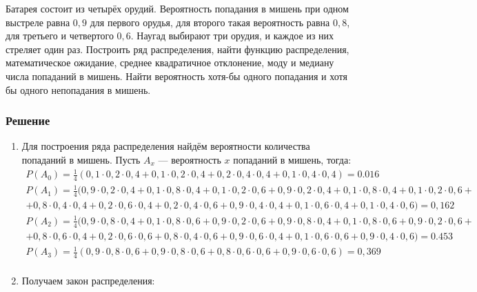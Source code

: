 \documentclass[14pt]{article}
\begin{document}
    Батарея состоит из четырёх орудий.
    Вероятность попадания в мишень при одном выстреле равна $0,9$ для первого орудья, для второго такая вероятность равна $0,8$, для третьего и четвертого $0,6$.
    Наугад выбирают три орудия, и каждое из них стреляет один раз.
    Построить ряд распределения, найти функцию распределения, математическое ожидание, среднее квадратичное отклонение, моду и медиану числа попаданий в мишень.
    Найти вероятность хотя-бы одного попадания и хотя бы одного непопадания в мишень.
    \subsubsection*{Решение}

    \begin{enumerate}[wide, labelwidth=!, labelindent=0pt]
        \item Для построения ряда распределения найдём вероятности количества попаданий в мишень.
        Пусть $A_x$ --- вероятность $x$ попаданий в мишень, тогда:
        \begin{gather*}
            P(A_0) = \frac{1}{4} ( 0,1 \cdot 0,2 \cdot 0,4 + 0,1 \cdot 0,2 \cdot 0,4 + 0,2 \cdot 0,4 \cdot 0,4 + 0,1 \cdot 0,4 \cdot 0,4 ) = 0.016  \\
            P(A_1) = \frac{1}{4} ( 0,9 \cdot 0,2 \cdot 0,4 + 0,1 \cdot 0,8 \cdot 0,4 + 0,1 \cdot 0,2 \cdot 0,6
            + 0,9 \cdot 0,2 \cdot 0,4 + 0,1 \cdot 0,8 \cdot 0,4 + 0,1 \cdot 0,2 \cdot 0,6 + \\
            + 0,8 \cdot 0,4 \cdot 0,4 + 0,2 \cdot 0,6 \cdot 0,4 + 0,2 \cdot 0,4 \cdot 0,6
            + 0,9 \cdot 0,4 \cdot 0,4 + 0,1 \cdot 0,6 \cdot 0,4 + 0,1 \cdot 0,4 \cdot 0,6 ) = 0,162 \\
            P(A_2) = \frac{1}{4} ( 0,9 \cdot 0,8 \cdot 0,4 + 0,1 \cdot 0,8 \cdot 0,6 + 0,9 \cdot 0,2 \cdot 0,6
            + 0,9 \cdot 0,8 \cdot 0,4 + 0,1 \cdot 0,8 \cdot 0,6 + 0,9 \cdot 0,2 \cdot 0,6 + \\
            + 0,8 \cdot 0,6 \cdot 0,4 + 0,2 \cdot 0,6 \cdot 0,6 + 0,8 \cdot 0,4 \cdot 0,6
            + 0,9 \cdot 0,6 \cdot 0,4 + 0,1 \cdot 0,6 \cdot 0,6 + 0,9 \cdot 0,4 \cdot 0,6 ) = 0.453 \\
            P(A_3) = \frac{1}{4} ( 0,9 \cdot 0,8 \cdot 0,6 + 0,9 \cdot 0,8 \cdot 0,6 + 0,8 \cdot 0,6 \cdot 0,6 + 0,9 \cdot 0,6 \cdot 0,6 ) = 0,369 \\
        \end{gather*}
        \item Получаем закон распределения:


\end{enumerate}
\end{document}
